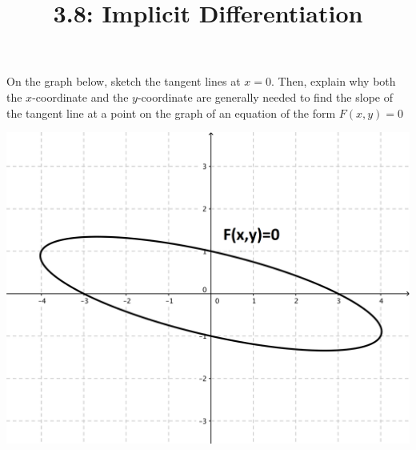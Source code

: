 \documentclass[nooutcomes,handout]{ximera}
\title{3.8: Implicit Differentiation}
\begin{document}
\begin{abstract}		\end{abstract}
\maketitle

\begin{problem}
On the graph below, sketch the tangent lines at $x=0$.  Then, explain why both the $x$-coordinate and the $y$-coordinate are generally needed to find the slope of the tangent line at a point on the graph of an equation of the form $F(x,y)=0$
\begin{image}
\includegraphics[scale=.2]{figure1.png}
\end{image}



\end{problem}
\end{document}
